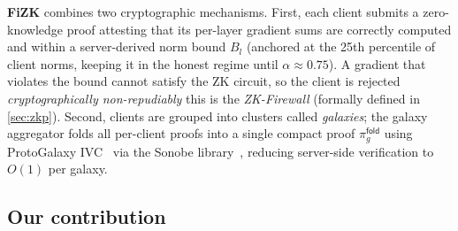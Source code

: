 \documentclass[10pt,twocolumn,letterpaper]{article}
\begin{document}
\textbf{FiZK} combines two cryptographic mechanisms. First, each client submits a zero-knowledge proof attesting that its per-layer gradient sums are correctly computed and within a server-derived norm bound $B_l$ (anchored at the 25th percentile of client norms, keeping it in the honest regime until $\alpha \approx 0.75$). A gradient that violates the bound cannot satisfy the ZK circuit, so the client is rejected \emph{cryptographically non-repudiably} this is the \emph{ZK-Firewall} (formally defined in \cref{sec:zkp}). Second, clients are grouped into clusters called \emph{galaxies}; the galaxy aggregator folds all per-client proofs into a single compact proof $\pi_g^{\mathsf{fold}}$ using ProtoGalaxy IVC~\cite{eagen2023protogalaxy} via the Sonobe library~\cite{sonobe2024}, reducing server-side verification to $O(1)$ per galaxy.

\subsection{Our contribution}






\end{document}
